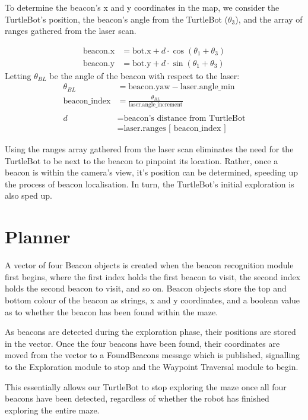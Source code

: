 \documentclass[titlepage,12pt,a4paper]{article}
\begin{document}
To determine the beacon's x and y coordinates in the map, we consider the TurtleBot's position, the beacon's angle from the TurtleBot ($\theta_3$), and the array of ranges gathered from the laser scan. 

\begin{align*}
	\text{beacon.x}		&=		\text{bot.x} + d \cdot \cos{(\theta_1 + \theta_3)} \\
	\text{beacon.y} 		&= 		\text{bot.y} + d \cdot \sin{(\theta_1 + \theta_3)} 
\end{align*}
Letting $\theta_{BL}$ be the angle of the beacon with respect to the laser: 
\begin{align*}
		\theta_{BL}	&= 		\text{beacon.yaw} - \text{laser.angle\_min} \\
   \text{beacon\_index}	&=		\frac{\theta_{BL}}{\text{laser.angle\_increment}} \\
   					 \\
				d 	&=		\text{beacon's distance from TurtleBot} \\
					&=		\text{laser.ranges [ beacon\_index ]} 
\end{align*}

Using the ranges array gathered from the laser scan eliminates the need for the TurtleBot to be next to the beacon to pinpoint its location. Rather, once a beacon is within the camera's view, it's position can be determined, speeding up the process of beacon localisation. In turn, the TurtleBot's initial exploration is also sped up.

\pagebreak
\section{Planner}

A vector of four Beacon objects is created when the beacon recognition module first begins, where the first index holds the first beacon to visit, the second index holds the second beacon to visit, and so on. Beacon objects store the top and bottom colour of the beacon as strings, x and y coordinates, and a boolean value as to whether the beacon has been found within the maze. 

As beacons are detected during the exploration phase, their positions are stored in the vector. Once the four beacons have been found, their coordinates are moved from the vector to a FoundBeacons message which is published, signalling to the Exploration module to stop and the Waypoint Traversal module to begin.

This essentially allows our TurtleBot to stop exploring the maze once all four beacons have been detected, regardless of whether the robot has finished exploring the entire maze.
\end{document}

